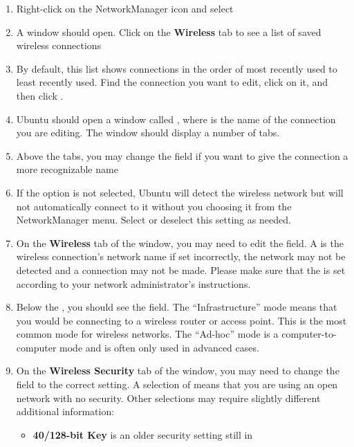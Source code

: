 \begin{enumerate}
  \item Right-click on the NetworkManager icon and select 
  \item A  window should open. Click on the
\textbf{Wireless} tab to see a list of saved wireless connections
  \item By default, this list shows connections in the order of most
recently used to least recently used. Find the connection you want to edit,
click on it, and then click .
  \item Ubuntu should open a window called ,
where  is the name of the connection you are editing. 
The window should display a number of tabs.
  \item Above the tabs, you may change the  field if 
you want to give the connection a more recognizable name
  \item If the  option is not selected, Ubuntu
will detect the wireless network but will not automatically connect to it
without you choosing it from the NetworkManager menu. Select or deselect this 
setting as needed.
  \item On the \textbf{Wireless} tab of the  window, you may need to edit the  field. A  is 
the wireless connection's network name \dash if set incorrectly, the network
may not be detected and a connection may not be made. Please make sure that
the  is set according to your network administrator's instructions.
  \item Below the , you should see the  field. The 
``Infrastructure'' mode means that you would be connecting to a wireless 
router or access point. This is the most common mode for wireless networks.
The ``Ad-hoc'' mode is a computer-to-computer mode and is often only used
in advanced cases.
  \item On the \textbf{Wireless Security} tab of the  window, you may need to change the 
field to the correct setting. A selection of  means that you are 
using an open network with no security. Other selections may require slightly
different additional information:
  \begin{itemize}
    \item \textbf{ 40/128-bit Key} is an older security setting still in

\end{itemize}
\end{enumerate}
